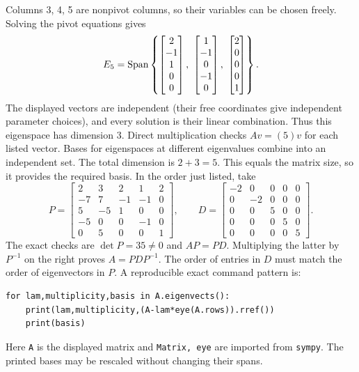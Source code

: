 Columns 3, 4, 5 are nonpivot columns, so their variables can be chosen freely. Solving the pivot equations gives
\[E_{5}=\Span\left\{\begin{bmatrix}2\\-1\\1\\0\\0\end{bmatrix},\ \begin{bmatrix}1\\-1\\0\\-1\\0\end{bmatrix},\ \begin{bmatrix}2\\0\\0\\0\\1\end{bmatrix}\right\}.\]
The displayed vectors are independent (their free coordinates give independent parameter choices), and every solution is their linear combination. Thus this eigenspace has dimension $3$. Direct multiplication checks $Av=(5)v$ for each listed vector.
Bases for eigenspaces at different eigenvalues combine into an independent set. The total dimension is $2+3=5$.
This equals the matrix size, so it provides the required basis. In the order just listed, take
\[P=\begin{bmatrix}2&3&2&1&2\\-7&7&-1&-1&0\\5&-5&1&0&0\\-5&0&0&-1&0\\0&5&0&0&1\end{bmatrix},\qquad D=\begin{bmatrix}-2&0&0&0&0\\0&-2&0&0&0\\0&0&5&0&0\\0&0&0&5&0\\0&0&0&0&5\end{bmatrix}.\]
The exact checks are $\det P=35\ne0$ and $AP=PD$. Multiplying the latter by $P^{-1}$ on the right proves $A=PDP^{-1}$. The order of entries in $D$ must match the order of eigenvectors in $P$.
A reproducible exact command pattern is:
\begin{verbatim}
for lam,multiplicity,basis in A.eigenvects():
    print(lam,multiplicity,(A-lam*eye(A.rows)).rref())
    print(basis)
\end{verbatim}
Here \texttt{A} is the displayed matrix and \texttt{Matrix, eye} are imported from \texttt{sympy}. The printed bases may be rescaled without changing their spans.

